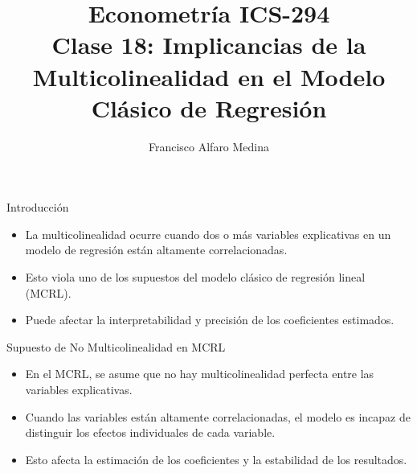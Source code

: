 \documentclass{beamer}
\title[ICS-162]{Econometría ICS-294\\ \small{Clase 18: Implicancias de la Multicolinealidad en el Modelo Clásico de Regresión }}
\author{Francisco Alfaro Medina}
\institute[USM]
{Universidad Técnica Federico Santa María\\ %
	\medskip
	\textit{} %
	
}
\date{}
\begin{document}
	
\begin{frame}
	\titlepage %


\end{frame}



\begin{frame}{Introducción}
    \begin{itemize}
        \item La multicolinealidad ocurre cuando dos o más variables explicativas en un modelo de regresión están altamente correlacionadas.
        \item Esto viola uno de los supuestos del modelo clásico de regresión lineal (MCRL).
        \item Puede afectar la interpretabilidad y precisión de los coeficientes estimados.
    \end{itemize}
\end{frame}

\begin{frame}{Supuesto de No Multicolinealidad en MCRL}
    \begin{itemize}
        \item En el MCRL, se asume que no hay multicolinealidad perfecta entre las variables explicativas.
        \item Cuando las variables están altamente correlacionadas, el modelo es incapaz de distinguir los efectos individuales de cada variable.
        \item Esto afecta la estimación de los coeficientes y la estabilidad de los resultados.
    \end{itemize}
\end{frame}
\end{document}
